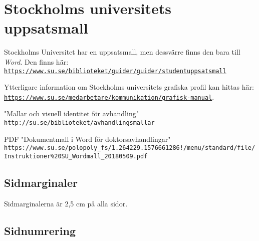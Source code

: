 
\section{Stockholms universitets uppsatsmall}
\label{utseende}

Stockholms Universitet har en uppsatsmall, men dessvärre finns den bara till
\textit{Word}. Den finns här: \texttt{\href{https://www.su.se/biblioteket/guider/guider/studentuppsatsmall}{https://\linebreak[0]{}www.su.se/\linebreak[0]{}biblioteket/\linebreak[0]{}guider/\linebreak[0]{}guider/\linebreak[0]{}studentuppsatsmall}}

Ytterligare information om Stockholms universitets grafiska profil kan hittas här:
\texttt{\href{https://www.su.se/medarbetare/kommunikation/grafisk-manual}{https://\linebreak[0]{}www.su.se/medarbetare/\linebreak[0]{}kommunikation/\linebreak[0]{}grafisk-manual}}.

"Mallar och visuell identitet för avhandling"
\verb|http://su.se/biblioteket/avhandlingsmallar|


PDF "Dokumentmall i Word för doktorsavhandlingar"
\verb|https://www.su.se/polopoly_fs/1.264229.1576661286!/menu/standard/file/Instruktioner%20SU_Wordmall_20180509.pdf|


\subsection{Sidmarginaler}

Sidmarginalerna är 2,5 cm på alla sidor.


\subsection{Sidnumrering}




